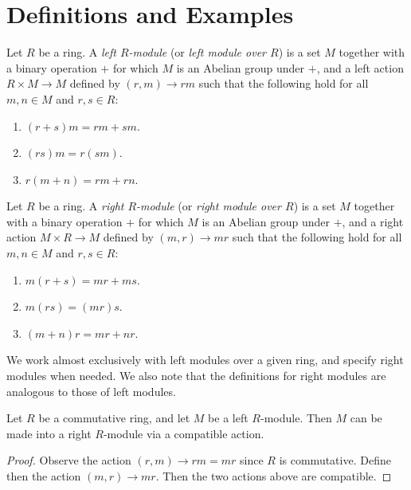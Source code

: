 \section{Definitions and Examples}

\begin{definition}
  Let $R$ be a ring. A \textit{left $R$-module} (or \textit{left
  module over $R$}) is a set $M$ together with a binary operation
  $+$ for which $M$ is an Abelian group under $+$, and a left action
  $R \times M \xrightarrow{} M$ defined by $(r,m) \xrightarrow{} rm$
  such that the following hold for all $m,n \in M$ and $r,s \in R$:
  \begin{enumerate}
    \item[(1)] $(r+s)m=rm+sm$.

    \item[(2)] $(rs)m=r(sm)$.

    \item[(3)] $r(m+n)=rm+rn$.
  \end{enumerate}
\end{definition}

\begin{definition}
  Let $R$ be a ring. A \textit{right $R$-module} (or \textit{right
  module over $R$}) is a set $M$ together with a binary operation
  $+$ for which $M$ is an Abelian group under $+$, and a right action
  $M \times R \xrightarrow{} M$ defined by $(m,r) \xrightarrow{} mr$
  such that the following hold for all $m,n \in M$ and $r,s \in R$:
  \begin{enumerate}
    \item[(1)] $m(r+s)=mr+ms$.

    \item[(2)] $m(rs)=(mr)s$.

    \item[(3)] $(m+n)r=mr+nr$.
  \end{enumerate}
\end{definition}

\begin{remark}
  We work almost exclusively with left modules over a given ring,
  and specify right modules when needed. We also note that the
  definitions for right modules are analogous to those of left
  modules.
\end{remark}

\begin{lemma}\label{lemma_9.1.1}
  Let $R$ be a commutative ring, and let $M$ be a left $R$-module.
  Then $M$ can be made into a right $R$-module via a compatible
  action.
\end{lemma}
\begin{proof}
  Observe the action $(r,m) \xrightarrow{} rm=mr$ since $R$ is
  commutative. Define then the action $(m,r) \xrightarrow{} mr$.
  Then the two actions above are compatible.
\end{proof}

